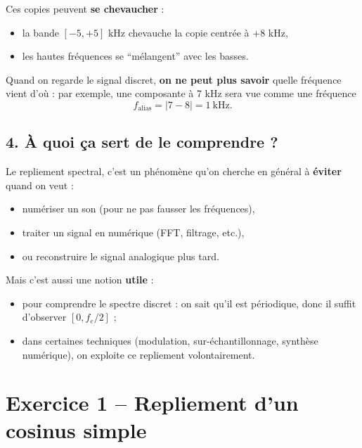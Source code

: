 Ces copies peuvent \textbf{se chevaucher} :
\begin{itemize}
    \item la bande $[-5, +5]$ kHz chevauche la copie centrée à $+8$ kHz,
    \item les hautes fréquences se ``mélangent'' avec les basses.
\end{itemize}

Quand on regarde le signal discret, \textbf{on ne peut plus savoir} quelle fréquence vient d'où :  
par exemple, une composante à 7 kHz sera vue comme une fréquence
\[
f_{\text{alias}} = |7 - 8| = 1~\text{kHz}.
\]

\begin{center}
\end{center}

\subsection*{4. À quoi ça sert de le comprendre ?}

Le repliement spectral, c'est un phénomène qu'on cherche en général à \textbf{éviter} quand on veut :
\begin{itemize}
    \item numériser un son (pour ne pas fausser les fréquences),
    \item traiter un signal en numérique (FFT, filtrage, etc.),
    \item ou reconstruire le signal analogique plus tard.
\end{itemize}

Mais c'est aussi une notion \textbf{utile} :
\begin{itemize}
    \item pour comprendre le spectre discret : on sait qu'il est périodique, donc il suffit d'observer $[0, f_e/2]$ ;
    \item dans certaines techniques (modulation, sur-échantillonnage, synthèse numérique), on exploite ce repliement volontairement.
\end{itemize}


\newpage
\section*{Exercice 1 – Repliement d’un cosinus simple}

